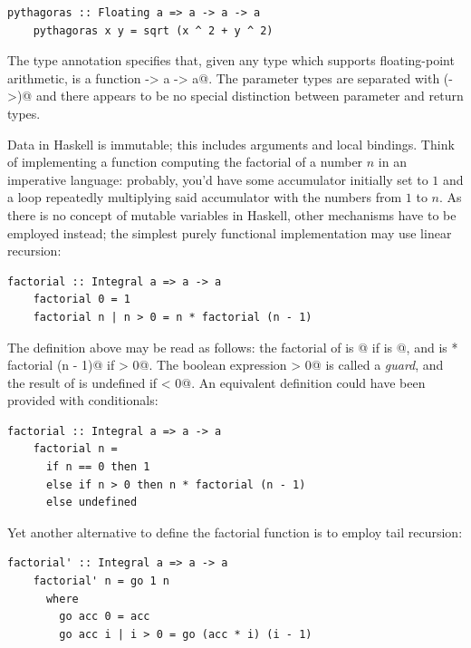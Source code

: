 \documentclass[UdineBachThesis,american,11pt]{PhdThesis}
\begin{document}
  \begin{lstlisting}[gobble=4,basicstyle=\ttfamily\small]
    pythagoras :: Floating a => a -> a -> a
    pythagoras x y = sqrt (x ^ 2 + y ^ 2)
  \end{lstlisting}

  The type annotation specifies that, given any type \lstinline@a@ which
  supports floating-point arithmetic, \lstinline@pythagoras@ is a function
  \lstinline@a -> a -> a@. The parameter types are separated with
  \lstinline@(->)@ and there appears to be no special distinction between
  parameter and return types.

  Data in Haskell is immutable; this includes arguments and local bindings.
  Think of implementing a function computing the factorial of a number $n$ in an
  imperative language: probably, you'd have some accumulator initially set to
  $1$ and a loop repeatedly multiplying said accumulator with the numbers from
  $1$ to $n$. As there is no concept of mutable variables in Haskell, other
  mechanisms have to be employed instead; the simplest purely functional
  implementation may use linear recursion:

  \begin{lstlisting}[gobble=4,basicstyle=\ttfamily\small]
    factorial :: Integral a => a -> a
    factorial 0 = 1
    factorial n | n > 0 = n * factorial (n - 1)
  \end{lstlisting}

  The definition above may be read as follows: the factorial of \lstinline@n@ is
  @ if \lstinline@n@ is @, and is
  \lstinline@n * factorial (n - 1)@ if \lstinline@n > 0@. The boolean expression
  \lstinline@n > 0@ is called a \emph{guard}, and the result of
  \lstinline@factorial@ is undefined if \lstinline@n < 0@. An equivalent
  definition could have been provided with conditionals:

  \begin{lstlisting}[gobble=4,basicstyle=\ttfamily\small]
    factorial :: Integral a => a -> a
    factorial n =
      if n == 0 then 1
      else if n > 0 then n * factorial (n - 1)
      else undefined
  \end{lstlisting}

  Yet another alternative to define the factorial function is to employ tail
  recursion:

  \pagebreak

  \begin{lstlisting}[gobble=4,basicstyle=\ttfamily\small]
    factorial' :: Integral a => a -> a
    factorial' n = go 1 n
      where
        go acc 0 = acc
        go acc i | i > 0 = go (acc * i) (i - 1)
  \end{lstlisting}
\end{document}
